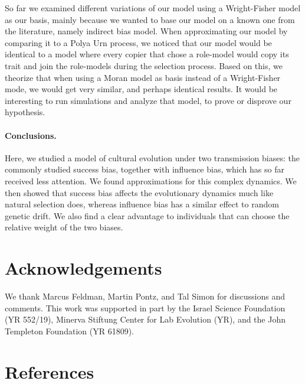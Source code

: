 \documentclass[12pt]{extarticle}
\begin{document}
So far we examined different variations of our model using a Wright-Fisher model as our basis, mainly because we wanted to base our model on a known one from the literature, namely \citet{evolutionBook} indirect bias model. When approximating our model by comparing it to a Polya Urn process, we noticed that our model would be identical to a model where every copier that chose a role-model would copy its trait and join the role-models during the selection process. Based on this, we theorize that when using a Moran model as basis instead of a Wright-Fisher mode, we would get very similar, and perhaps identical results. It would be interesting to run simulations and analyze that model, to prove or disprove our hypothesis.

\paragraph{Conclusions.}
Here, we studied a model of cultural evolution under two transmission biases: the commonly studied success bias, together with influence bias, which has so far received less attention. We found approximations for this complex dynamics. We then showed that success bias affects the evolutionary dynamics much like natural selection does, whereas influence bias has a similar effect to random genetic drift. We also find a clear advantage to individuals that can choose the relative weight of the two biases.

{\small
\section*{Acknowledgements}
We thank Marcus Feldman, Martin Pontz, and Tal Simon for discussions and comments.
This work was supported in part by 
the Israel Science Foundation (YR 552/19),
Minerva Stiftung Center for Lab Evolution (YR),
and 
the John Templeton Foundation (YR 61809).
}

\section*{References}
\nolinenumbers

%


\pagebreak
\end{document}
